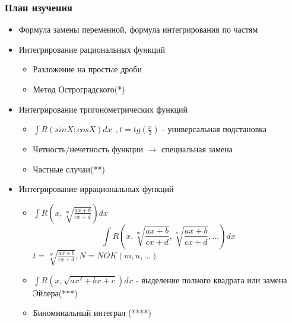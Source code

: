 \documentclass[a4paper]{article}
\theoremstyle{definition}
\newtheorem*{comment}{Замечание}
\numberwithin{theorem}{subsection}
\numberwithin{lemma}{subsection}
\numberwithin{definition}{subsection}
\numberwithin{comment*}{subsection}
\numberwithin{consequence}{subsection}
\numberwithin{property}{subsection}
\begin{document}
\subsubsection{План изучения}
\begin{itemize}
 \item Формула замены переменной, формула интегрирования по частям
 \item Интегрирование рациональных функций
       \begin{itemize}
        \item Разложение на простые дроби
        \item Метод Остроградского(*)
       \end{itemize}
 \item Интегрирование тригонометрических функций
       \begin{itemize}
        \item $\int R(sinX; cosX) dx \ \ ,  t=tg(\frac{x}{2})$ - универсальная подстановка
        \item Четность/нечетность функции $\rightarrow$ специальная замена
        \item Частные случаи(**)
       \end{itemize}
 \item Интегрирование иррациональных функций
       \begin{itemize}
        \item $\int R(x, \sqrt[m]{\frac{ax+b}{cx+d}}) dx$
              $$\int R(x, \sqrt[m]{\frac{ax+b}{cx+d}}, \sqrt[n]{\frac{ax+b}{cx+d}}, \dots ) dx $$
              $t = \sqrt[N]{\frac{ax+b}{cx+d}}, N = NOK(m,n, \dots)$
        \item $\int R(x, \sqrt{ax^2+bx+c}) dx$ - выделение полного квадрата или замена Эйлера(***)
        \item Биноминальный интеграл (****)
       \end{itemize}
\end{itemize}

\end{document}

